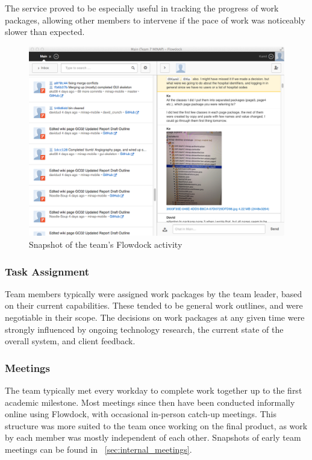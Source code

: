 \documentclass[12pt,a4paper,oneside,titlepage]{article}
\begin{document}
The service proved to be especially useful in tracking the progress of work packages, allowing other members to intervene if the pace of work was noticeably slower than expected. 
\begin{figure}[h!]
\centering
\includegraphics[scale=0.4]{img/flowdock.png}
\caption{Snapshot of the team's Flowdock activity}
\end{figure}
\subsubsection{Task Assignment}
Team members typically were assigned work packages by the team leader, based on their current capabilities. These tended to be general work outlines, and were negotiable in their scope. The decisions on work packages at any given time were strongly influenced by ongoing technology research, the current state of the overall system, and client feedback.
\subsubsection{Meetings}
The team typically met every workday to complete work together up to the first academic milestone. Most meetings since then have been conducted informally online using Flowdock, with occasional in-person catch-up meetings. This structure was more suited to the team once working on the final product, as work by each member was mostly independent of each other. Snapshots of early team meetings can be found in ~\cref{sec:internal_meetings}. 
\end{document}
